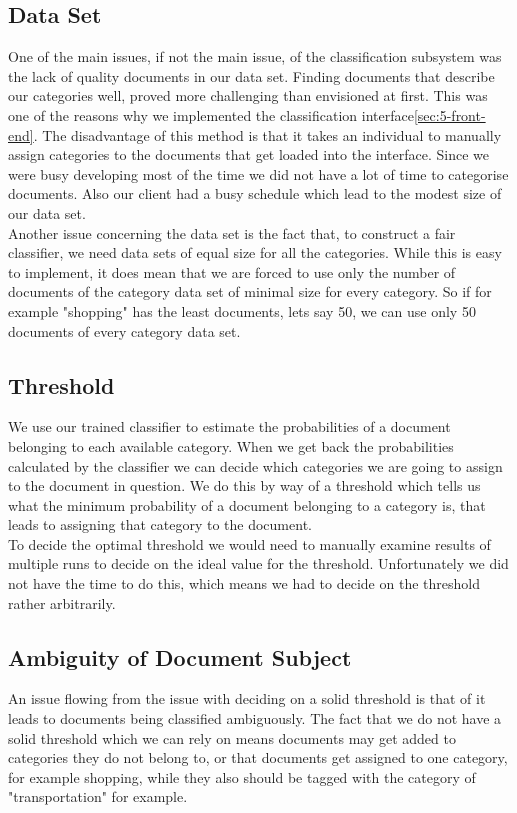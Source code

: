 \subsection{Data Set}
One of the main issues, if not the main issue, of the classification subsystem was the lack of quality documents in our data set. Finding documents that describe our categories well, proved more challenging than envisioned at first. This was one of the reasons why we implemented the classification interface\ref{sec:5-front-end}. The disadvantage of this method is that it takes an individual to manually assign categories to the documents that get loaded into the interface. Since we were busy developing most of the time we did not have a lot of time to categorise documents. Also our client had a busy schedule which lead to the modest size of our data set.\\
Another issue concerning the data set is the fact that, to construct a fair classifier, we need data sets of equal size for all the categories. While this is easy to implement, it does mean that we are forced to use only the number of documents of the category data set of minimal size for every category. So if for example "shopping" has the least documents, lets say 50, we can use only 50 documents of every category data set.

\subsection{Threshold}
We use our trained classifier to estimate the probabilities of a document belonging to each available category. When we get back the probabilities calculated by the classifier we can decide which categories we are going to assign to the document in question. We do this by way of a threshold which tells us what the minimum probability of a document belonging to a category is, that leads to assigning that category to the document.\\
To decide the optimal threshold we would need to manually examine results of multiple runs to decide on the ideal value for the threshold. Unfortunately we did not have the time to do this, which means we had to decide on the threshold rather arbitrarily.

\subsection{Ambiguity of Document Subject}
An issue flowing from the issue with deciding on a solid threshold is that of it leads to documents being classified ambiguously. The fact that we do not have a solid threshold which we can rely on means documents may get added to categories they do not belong to, or that documents get assigned to one category, for example shopping, while they also should be tagged with the category of "transportation" for example.

